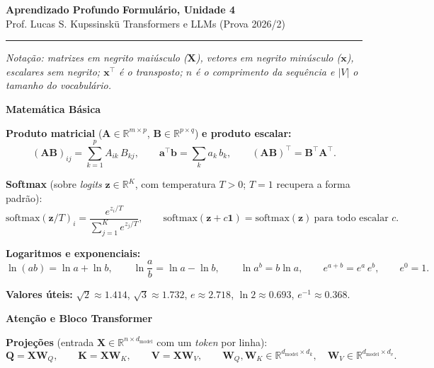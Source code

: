 \documentclass[11pt,a4paper]{article}
\newcommand{\bloco}[1]{%
  \par\vspace{0.3em}%
  {\bfseries\large #1}\par%
  \vspace{-0.4em}{\color{gray!60}\rule{\linewidth}{0.4pt}}\par%
}
\begin{document}
{\Large\bfseries Aprendizado Profundo} \hfill \textbf{Formulário, Unidade 4}\\
Prof. Lucas S. Kupssinskü \hfill Transformers e LLMs (Prova 2026/2)

\rule{\linewidth}{0.8pt}

\textit{Notação: matrizes em negrito maiúsculo ($\mathbf{X}$), vetores em negrito minúsculo ($\mathbf{x}$), escalares sem negrito; $\mathbf{x}^{\top}$ é o transposto; $n$ é o comprimento da sequência e $|V|$ o tamanho do vocabulário.}

\bloco{Matemática Básica}

\textbf{Produto matricial} ($\mathbf{A} \in \mathbb{R}^{m \times p}$, $\mathbf{B} \in \mathbb{R}^{p \times q}$) \textbf{e produto escalar:}
\[
  (\mathbf{A}\mathbf{B})_{ij} = \sum_{k=1}^{p} A_{ik}\, B_{kj},
  \qquad
  \mathbf{a}^{\top}\mathbf{b} = \sum_{k} a_k\, b_k,
  \qquad
  (\mathbf{A}\mathbf{B})^{\top} = \mathbf{B}^{\top}\mathbf{A}^{\top}.
\]

\textbf{Softmax} (sobre \textit{logits} $\mathbf{z} \in \mathbb{R}^{K}$, com temperatura $T > 0$; $T = 1$ recupera a forma padrão):
\[
  \mathrm{softmax}(\mathbf{z}/T)_i = \frac{e^{z_i/T}}{\sum_{j=1}^{K} e^{z_j/T}},
  \qquad
  \mathrm{softmax}(\mathbf{z} + c\mathbf{1}) = \mathrm{softmax}(\mathbf{z}) \ \text{para todo escalar } c.
\]

\textbf{Logaritmos e exponenciais:}
\[
  \ln(ab) = \ln a + \ln b, \qquad
  \ln\frac{a}{b} = \ln a - \ln b, \qquad
  \ln a^{b} = b \ln a, \qquad
  e^{a+b} = e^{a}\,e^{b}, \qquad
  e^{0} = 1.
\]

\textbf{Valores úteis:} $\sqrt{2} \approx 1.414$, \quad $\sqrt{3} \approx 1.732$, \quad $e \approx 2.718$, \quad $\ln 2 \approx 0.693$, \quad $e^{-1} \approx 0.368$.

\bloco{Atenção e Bloco Transformer}

\textbf{Projeções} (entrada $\mathbf{X} \in \mathbb{R}^{n \times d_\text{model}}$ com um \textit{token} por linha):
\[
  \mathbf{Q} = \mathbf{X}\mathbf{W}_Q, \qquad
  \mathbf{K} = \mathbf{X}\mathbf{W}_K, \qquad
  \mathbf{V} = \mathbf{X}\mathbf{W}_V,
  \qquad
  \mathbf{W}_Q, \mathbf{W}_K \in \mathbb{R}^{d_\text{model} \times d_k}, \quad
  \mathbf{W}_V \in \mathbb{R}^{d_\text{model} \times d_v}.
\]
\end{document}
